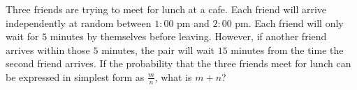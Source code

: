 Three friends are trying to meet for lunch at a cafe. Each friend will arrive independently at random between $1\!:\!00$ pm and $2\!:\!00$ pm. Each friend will only wait for $5$ minutes by themselves before leaving. However, if another friend arrives within those $5$ minutes, the pair will wait $15$ minutes from the time the second friend arrives. If the probability that the three friends meet for lunch can be expressed in simplest form as $\tfrac{m}{n}$,  what is $m+n$?